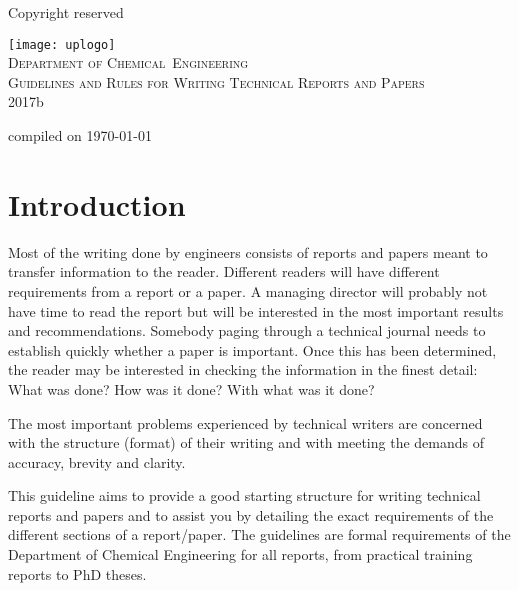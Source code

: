 \documentclass[a5paper, 10pt]{article}
\begin{document}
\begin{titlepage}
  \begin{centering}
    \begin{flushright}Copyright reserved\end{flushright}
    \vfil
    \texttt{[image: uplogo]}\\
    \vfil
    {\Huge\scshape
    Department of Chemical~Engineering\\
    \vfil
    Guidelines and Rules for Writing Technical Reports and Papers\\}
  \vfil
  2017b \\
  \vfil
  \begin{flushright}\small{compiled on \today}\end{flushright}
\end{centering}

\end{titlepage}

\pagestyle{empty}

\cleardoublepage

\setcounter{page}{1}
\pagestyle{plain}
\tableofcontents
\newpage

\pagestyle{empty}
\cleardoublepage
\setcounter{page}{1}
\pagestyle{plain}

\section{Introduction}
\label{cha:introduction}
Most of the writing done by engineers consists of reports and papers
meant to transfer information to the reader.  Different readers will
have different requirements from a report or a paper.  A managing
director will probably not have time to read the report but will be
interested in the most important results and recommendations.
Somebody paging through a technical journal needs to establish quickly
whether a paper is important.  Once this has been determined, the
reader may be interested in checking the information in the finest
detail: 
What was done?  
How was it done?  
With what was it done?

The most important problems experienced by technical writers are
concerned with the structure (format) of their writing and with
meeting the demands of accuracy, brevity and clarity.

This guideline aims to provide a good starting structure for writing
technical reports and papers and to assist you by detailing the
exact requirements of the different sections of a report/paper. The
guidelines are formal requirements of the Department of Chemical
Engineering for all reports, from practical training reports to PhD
theses.
\end{document}
